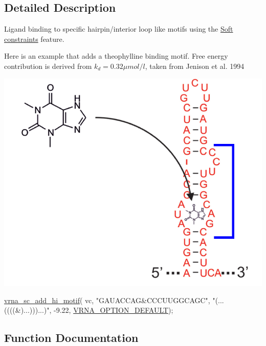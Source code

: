 \subsection{Detailed Description}
Ligand binding to specific hairpin/interior loop like motifs using the \hyperlink{group__soft__constraints}{Soft constraints} feature. 

Here is an example that adds a theophylline binding motif. Free energy contribution is derived from $k_d = 0.32 \mu mol / l $, taken from Jenison et al. 1994

 
\begin{DoxyImageNoCaption}
  \mbox{\includegraphics[width=\textwidth,height=\textheight/2,keepaspectratio=true]{theo_aptamer}}
\end{DoxyImageNoCaption}



\begin{DoxyCode}
\hyperlink{group__constraints__ligand_gaa6ff0113a3a76dc0b8d62961f4e1dfa0}{vrna\_sc\_add\_hi\_motif}( vc,
                      \textcolor{stringliteral}{"GAUACCAG&CCCUUGGCAGC"},
                      \textcolor{stringliteral}{"(...((((&)...)))...)"},
                      -9.22, \hyperlink{group__fold__compound_gacea5b7ee6181c485f36e2afa0e9089e4}{VRNA\_OPTION\_DEFAULT}); 
\end{DoxyCode}
 

\subsection{Function Documentation}
\mbox{\label{group__constraints__ligand_gaa6ff0113a3a76dc0b8d62961f4e1dfa0}} 
